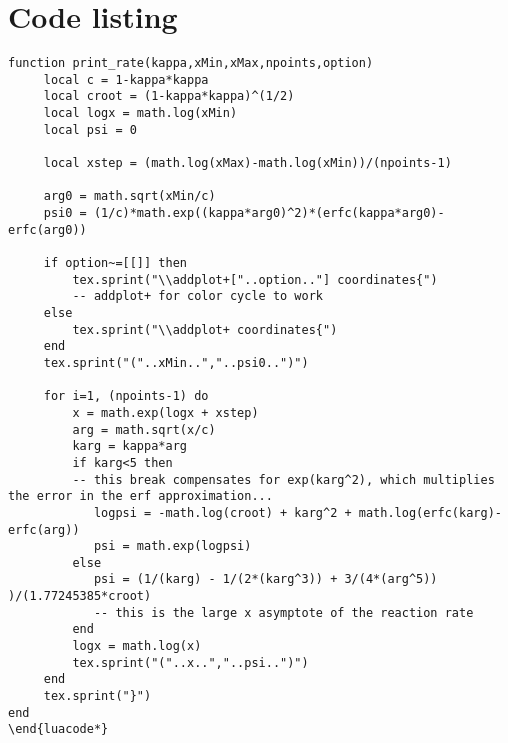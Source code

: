 

\chapter{Code listing}

%
%

\begin{lstlisting}
function print_rate(kappa,xMin,xMax,npoints,option)
     local c = 1-kappa*kappa
     local croot = (1-kappa*kappa)^(1/2)
     local logx = math.log(xMin)
     local psi = 0
     
     local xstep = (math.log(xMax)-math.log(xMin))/(npoints-1)
     
     arg0 = math.sqrt(xMin/c)
     psi0 = (1/c)*math.exp((kappa*arg0)^2)*(erfc(kappa*arg0)-erfc(arg0))
     
     if option~=[[]] then
  		 tex.sprint("\\addplot+["..option.."] coordinates{") 
  		 -- addplot+ for color cycle to work
     else
  		 tex.sprint("\\addplot+ coordinates{")
     end
     tex.sprint("("..xMin..","..psi0..")")
     
     for i=1, (npoints-1) do
  		 x = math.exp(logx + xstep)
  		 arg = math.sqrt(x/c)
  		 karg = kappa*arg
  		 if karg<5 then 
		 -- this break compensates for exp(karg^2), which multiplies the error in the erf approximation...
  		    logpsi = -math.log(croot) + karg^2 + math.log(erfc(karg)-erfc(arg))
  		    psi = math.exp(logpsi)
  		 else
  		    psi = (1/(karg) - 1/(2*(karg^3)) + 3/(4*(arg^5)) )/(1.77245385*croot)
  		    -- this is the large x asymptote of the reaction rate
  		 end
  		 logx = math.log(x)
  		 tex.sprint("("..x..","..psi..")")
     end
     tex.sprint("}")
end
\end{luacode*}
\end{lstlisting}

